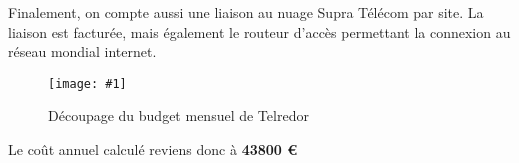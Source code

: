 \documentclass{article}
\newenvironment{figue}[1]{
	\par
	\bigskip
	\begin{figure}[h]
	\begin{center}
	  \texttt{[image: \#1]}
	\end{center}
}{
	\end{figure}
	\bigskip
}
\newcommand{\tlr}{Telredor\xspace}
\newcommand{\spr}{Supra Télécom\xspace}
\begin{document}
	Finalement, on compte aussi une liaison au nuage \spr par site. La liaison est facturée, mais également le routeur d'accès permettant la connexion au réseau mondial internet.
	
	\begin{figue}{img/telredor.png}
		\caption{Découpage du budget mensuel de \tlr}
	\end{figue}
	
	Le coût annuel calculé reviens donc à \textbf{43800 \euro}
\end{document}
